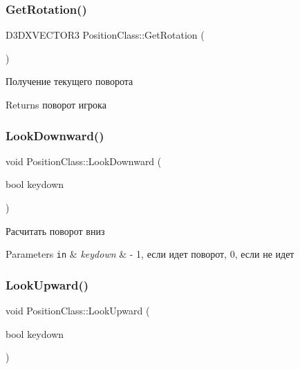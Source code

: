 \subsubsection{\texorpdfstring{Get\+Rotation()}{GetRotation()}}
{\footnotesize\ttfamily D3\+D\+X\+V\+E\+C\+T\+O\+R3 Position\+Class\+::\+Get\+Rotation (\begin{DoxyParamCaption}{ }\end{DoxyParamCaption})}



Получение текущего поворота 

\begin{DoxyReturn}{Returns}
поворот игрока 
\end{DoxyReturn}
\mbox{\label{class_position_class_a244538ba3f1719f4d72798d41500df2a}} 
\subsubsection{\texorpdfstring{Look\+Downward()}{LookDownward()}}
{\footnotesize\ttfamily void Position\+Class\+::\+Look\+Downward (\begin{DoxyParamCaption}\item[{bool}]{keydown }\end{DoxyParamCaption})}



Расчитать поворот вниз 


\begin{DoxyParams}[1]{Parameters}
\mbox{\tt in}  & {\em keydown} & -\/ 1, если идет поворот, 0, если не идет \\
\hline
\end{DoxyParams}
\mbox{\label{class_position_class_a1643d2ad4f9807b464f1ea9d40fe6ad6}} 
\subsubsection{\texorpdfstring{Look\+Upward()}{LookUpward()}}
{\footnotesize\ttfamily void Position\+Class\+::\+Look\+Upward (\begin{DoxyParamCaption}\item[{bool}]{keydown }\end{DoxyParamCaption})}



